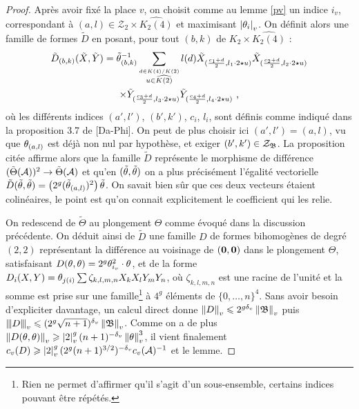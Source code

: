 \begin{proof}
Après avoir fixé la place $v$, on choisit comme au lemme \ref{pv} un indice $i_v$, correspondant à $(a, l) \in \mathcal{Z}_2 \times \widehat{K_2(4)}$ et maximisant $\left\lvert\theta_i\right\rvert_{v}$. On définit alors une famille de formes $\tilde{D}$ en posant, pour tout $(b, k)$ de $K_2 \times \widehat{K_2(4)}$ :
\begin{multline*}
\tilde{D}_{(b, k)}(\tilde{X}, \tilde{Y}) = \tilde{\theta}_{(b, k)}^{-1} 
\sum_{\stackrel{d \in K(4)/K(2)}{u \in \widehat{K(2)}}} l(d) \tilde{X}_{(\frac{c_1+d}{2}, l_1\cdot2\star u)}
\tilde{X}_{(\frac{c_2+d}{2}, l_2\cdot2\star u)} \\\times \tilde{Y}_{(\frac{c_3+d}{2}, l_3\cdot2\star u)} \tilde{Y}_{(\frac{c_4+d}{2}, l_4\cdot2\star u)} \text{ ,}
\end{multline*}
où les différents indices $(a', l')$, $(b', k')$, $c_i$, $l_i$, sont définis comme indiqué dans la proposition 3.7 de [Da-Phi]. On peut de plus choisir ici $(a', l')= (a, l)$, vu que $\theta_{(a, l)}$ est déjà non nul par hypothèse, et exiger $(b', k') \in \mathcal{Z}_{\mathfrak{B}}$. La proposition citée affirme alors que la famille $\tilde{D}$ représente le morphisme de différence $(\tilde\Theta(\mathcal{A}))^2 \to \tilde\Theta(\mathcal{A})$ et qu'en $(\tilde{\theta}, \tilde{\theta})$ on a plus précisément l'égalité vectorielle $\tilde{D}(\tilde{\theta}, \tilde{\theta}) = \left( 2^g (\tilde{\theta}_{(a, l)})^2\right) \tilde{\theta}$. On savait bien sûr que ces deux vecteurs étaient colinéaires, le point est qu'on connait explicitement le coefficient qui les relie.

On redescend de $\tilde\Theta$ au plongement $\Theta$ comme évoqué dans la discussion précédente. On déduit ainsi de $\tilde D$ une famille $D$ de formes bihomogènes de degré $(2, 2)$ représentant la différence au voisinage de $({\boldsymbol{0}}, {\boldsymbol{0}})$ dans le plongement $\Theta$, satisfaisant $D(\theta, \theta) = 2^g \theta_{i_v}^2 \cdot \theta$, et de la forme $D_i(X, Y)= \theta_{j(i)} \sum \zeta_{k,l,m,n} X_kX_lY_mY_n$, où $\zeta_{k,l,m,n}$ est une racine de l'unité et la somme est prise sur une famille\footnote{Rien ne permet  d'affirmer qu'il s'agit d'un sous-ensemble, certains indices pouvant être répétés.} à $4^g$ éléments de $\{0, \dots, n\}^4$. Sans avoir besoin d'expliciter davantage, un calcul direct donne $\left\lVert D\right\rVert_{v} \leqslant 2^{g{\delta_v}} \left\lVert\mathfrak{B}\right\rVert_{v}$ puis $\left\lvert\hspace{-1pt}\left\lvert\hspace{-1pt}\left\lvert D\right\rvert\hspace{-1pt}\right\rvert\hspace{-1pt}\right\rvert_{v} \leqslant (2^g\sqrt{n+1})^{\delta_v} \left\lVert\mathfrak{B}\right\rVert_{v}$. Comme on a de plus $\left\lVert D(\theta, \theta)\right\rVert_{v} \geqslant \left\lvert2\right\rvert_{v}^g(n+1)^{-{\delta_v}}\left\lVert\theta\right\rVert_{v}^3$, il vient finalement $c_v(D) \geqslant \left\lvert2\right\rvert_{v}^g (2^g(n+1)^{3/2})^{-{\delta_v}} c_v(\mathcal{A})^{-1}$ et le lemme.
\end{proof}

